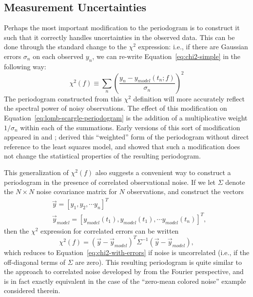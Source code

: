 \documentclass[preprint]{aastex}
\newcommand{\Eq}[1]{Equation~\ref{eq:#1}}
\newcommand{\eq}[1]{\Eq{#1}}
\newcommand{\eqlabel}[1]{\label{eq:#1}}
\newcommand{\sectlabel}[1]{\label{sect:#1}}
\begin{document}
\subsection{Measurement Uncertainties}
\sectlabel{extensions-observational-noise}
Perhaps the most important modification to the periodogram is to
construct it such that it correctly handles uncertainties in the observed data.
This can be done through the standard change to the $\chi^2$ expression:
i.e., if there are Gaussian errors $\sigma_n$ on each observed $y_n$,
we can re-write \eq{chi2-simple} in the following way:
\begin{equation}
  \chi^2(f) \equiv \sum_n \left(\frac{y_n - y_{model}(t_n;f)}{\sigma_n}\right)^2
  \eqlabel{chi2-with-errors}
\end{equation}
The periodogram constructed from this $\chi^2$ definition will more accurately
reflect the spectral power of noisy observations.
The effect of this modification on \eq{lomb-scargle-periodogram} is the addition
of a multiplicative weight $1/\sigma_n$ within each of the summations.
Early versions of this sort of modification appeared in \citet{Gilliland87} and
\citet{Irwin89}; \citet{Scargle89} derived this ``weighted'' form of the
periodogram without direct reference to the least squares model,
and \citet{Zechmeister09} showed that such a modification does not change
the statistical properties of the resulting periodogram.

This generalization of $\chi^2(f)$ also suggests a convenient way to
construct a periodogram in the presence of correlated observational noise.
If we let $\Sigma$ denote the  $N\times N$ noise
covariance matrix for $N$ observations, and construct the
vectors
\begin{eqnarray}
  &\vec{y} = [y_1, y_2,\cdots y_n]^T \nonumber\\
  &\vec{y}_{model} = [y_{model}(t_1),y_{model}(t_1),\cdots y_{model}(t_n)]^T,
\end{eqnarray}
then the $\chi^2$ expression for correlated errors can be written
\begin{equation}
  \chi^2(f) = (\vec{y}-\vec{y}_{model})^T\Sigma^{-1}(\vec{y}-\vec{y}_{model}),
  \eqlabel{chi2-with-correlated-errors}
\end{equation}
which reduces to \eq{chi2-with-errors} if noise is uncorrelated (i.e., if the
off-diagonal terms of $\Sigma$ are zero).
This resulting periodogram is quite similar to the approach to correlated
noise developed by \citet{Vio2010} from the Fourier perspective,
and is in fact exactly equivalent in the case of the
``zero-mean colored noise'' example considered therein.
\end{document}
